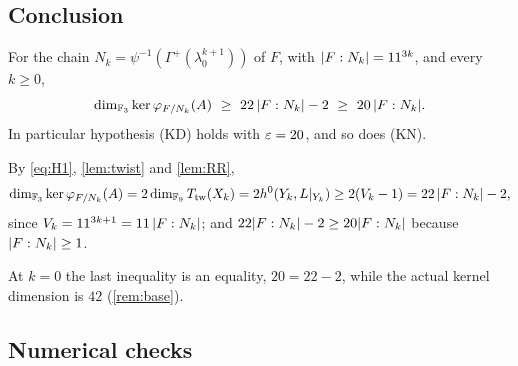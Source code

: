 \subsection{Conclusion}\label{sec:proofH}

\begin{theorem}[Theorem H]\label{thm:H}
\notformalized
For the chain $N_k=\psi^{-1}(\Gamma^+(\lambda_0^{k+1}))$ of $F$, with $\lvert F:N_k \rvert=11^{3k}$, and every $k\ge0$,
\[
  \dim_{\F_3}\ker\varphi_{F/N_k}(A)\ \ge\ 22\,\abs{F:N_k}-2\ \ge\ 20\,\abs{F:N_k}.
\]
In particular hypothesis (KD) holds with $\varepsilon=20$, and so does (KN).
\end{theorem}
\begin{informalproof}
By \cref{eq:H1}, \cref{lem:twist} and \cref{lem:RR},
\[
  \dim_{\mathbb{F}_3}\ker\varphi_{F/N_k}(A)=2\dim_{\mathbb{F}_9}T_{\mathrm{tw}}(X_k)=2h^0(Y_k,L|_{Y_k})\ge2(V_k-1)=22\,\lvert F:N_k \rvert-2,
\]
since $V_k=11^{3k+1}=11\,\lvert F:N_k \rvert$; and $22\lvert F:N_k \rvert-2\ge20\lvert F:N_k \rvert$ because $\lvert F:N_k \rvert\ge1$.
\end{informalproof}

At $k=0$ the last inequality is an equality, $20=22-2$, while the actual kernel dimension is $42$ (\cref{rem:base}).

\subsection{Numerical checks}\label{sec:numerics}

